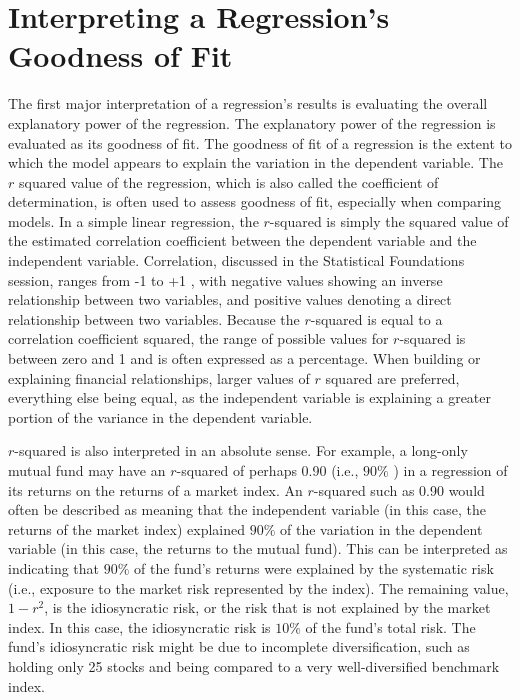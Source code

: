 \documentclass[11pt]{article}
\begin{document}
\section*{Interpreting a Regression's Goodness of Fit}
The first major interpretation of a regression's results is evaluating the overall explanatory power of the regression. The explanatory power of the regression is evaluated as its goodness of fit. The goodness of fit of a regression is the extent to which the model appears to explain the variation in the dependent variable. The $r$ squared value of the regression, which is also called the coefficient of determination, is often used to assess goodness of fit, especially when comparing models. In a simple linear regression, the $r$-squared is simply the squared value of the estimated correlation coefficient between the dependent variable and the independent variable. Correlation, discussed in the Statistical Foundations session, ranges from -1 to +1 , with negative values showing an inverse relationship between two variables, and positive values denoting a direct relationship between two variables. Because the $r$-squared is equal to a correlation coefficient squared, the range of possible values for $r$-squared is between zero and 1 and is often expressed as a percentage. When building or explaining financial relationships, larger values of $r$ squared are preferred, everything else being equal, as the independent variable is explaining a greater portion of the variance in the dependent variable.

$r$-squared is also interpreted in an absolute sense. For example, a long-only mutual fund may have an $r$-squared of perhaps 0.90 (i.e., $90 \%$ ) in a regression of its returns on the returns of a market index. An $r$-squared such as 0.90 would often be described as meaning that the independent variable (in this case, the returns of the market index) explained $90 \%$ of the variation in the dependent variable (in this case, the returns to the mutual fund). This can be interpreted as indicating that $90 \%$ of the fund's returns were explained by the systematic risk (i.e., exposure to the market risk represented by the index). The remaining value, $1-r^{2}$, is the idiosyncratic risk, or the risk that is not explained by the market index. In this case, the idiosyncratic risk is $10 \%$ of the fund's total risk. The fund's idiosyncratic risk might be due to incomplete diversification, such as holding only 25 stocks and being compared to a very well-diversified benchmark index.
\end{document}
